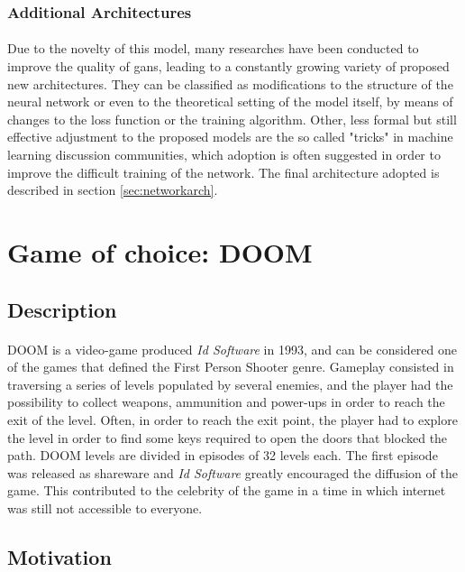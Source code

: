 \subsubsection{Additional Architectures}
\paragraph{} Due to the novelty of this model, many researches have been conducted to improve the quality of \glspl{gan}, leading to a constantly growing variety of proposed new architectures. They can be classified as modifications to the structure of the neural network or even to the theoretical setting of the model itself, by means of changes to the loss function or the training algorithm. Other, less formal but still effective adjustment to the proposed models are the so called "tricks" in machine learning discussion communities, which adoption is often suggested in order to improve the difficult training of the network. The final architecture adopted is described in section \ref{sec:networkarch}.


\section{Game of choice: DOOM}
\label{sec:doominfo}
\subsection{Description}
\paragraph{} DOOM is a video-game produced \textit{Id Software} in 1993, and can be considered one of the games that defined the First Person Shooter genre. Gameplay consisted in traversing a series of levels populated by several enemies, and the player had the possibility to collect weapons, ammunition and power-ups in order to reach the exit of the level. Often, in order to reach the exit point, the player had to explore the level in order to find some keys required to open the doors that blocked the path. DOOM levels are divided in episodes of 32 levels each. The first episode was released as shareware and \textit{Id Software} greatly encouraged the diffusion of the game. This contributed to the celebrity of the game in a time in which internet was still not accessible to everyone.

\subsection{Motivation}

